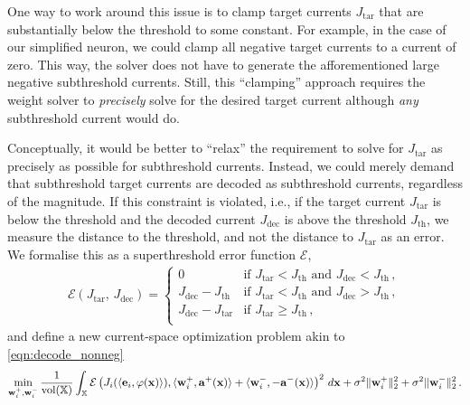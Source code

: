 One way to work around this issue is to clamp target currents $J_\mathrm{tar}$ that are substantially below the threshold to some constant.
For example, in the case of our simplified \LIF neuron, we could clamp all negative target currents to a current of zero.
This way, the solver does not have to generate the afforementioned large negative subthreshold currents.
Still, this \enquote{clamping} approach requires the weight solver to \emph{precisely} solve for the desired target current although \emph{any} subthreshold current would do.

Conceptually, it would be better to \enquote{relax} the requirement to solve for $J_\mathrm{tar}$ as precisely as possible for subthreshold currents.
Instead, we could merely demand that subthreshold target currents are decoded as subthreshold currents, regardless of the magnitude.
If this constraint is violated, i.e., if the target current $J_\mathrm{tar}$ is below the threshold and the decoded current $J_\mathrm{dec}$ is above the threshold $J_\mathrm{th}$, we measure the distance to the threshold, and not the distance to $J_\mathrm{tar}$ as an error.
We formalise this as a superthreshold error function $\mathcal{E}$,
\begin{align}
\mathcal{E}(J_\mathrm{tar}, \, J_\mathrm{dec}) = \begin{cases}
0 & \text{if } J_\mathrm{tar} < J_\mathrm{th} \text{ and } J_\mathrm{dec} < J_\mathrm{th} \,,\\
J_\mathrm{dec} - J_\mathrm{th} & \text{if } J_\mathrm{tar} < J_\mathrm{th} \text{ and } J_\mathrm{dec} > J_\mathrm{th} \,,\\
J_\mathrm{dec} - J_\mathrm{tar} & \text{if } J_\mathrm{tar} \geq J_\mathrm{th} \,,\\
\end{cases}
\label{eqn:subthreshold_error}
\end{align}
and define a new current-space optimization problem akin to \cref{eqn:decode_nonneg}
\begin{align}
	\min_{\mathbf{w}_i^+, \mathbf{w}_i^-} 
	\frac{1}{\operatorname{vol}(\mathbb{X})}
	\int_{\mathbb{X}} \mathcal{E}\left( 
		J_i(\langle \mathbf{e}_i, \varphi(\mathbf{x})\rangle),
		\langle \mathbf{w}_i^+, \mathbf{a}^+(\mathbf{x}) \rangle +
		\langle \mathbf{w}_i^-, -\mathbf{a}^-(\mathbf{x}) \rangle
	\right)^2 \, d\mathbf{x}
	+ \sigma^2 \| \mathbf{w}^+_i \|_\mathrm{2}^2
	+ \sigma^2 \| \mathbf{w}^-_i \|_\mathrm{2}^2\,.
\label{eqn:decode_current_subthreshold}
\end{align}


